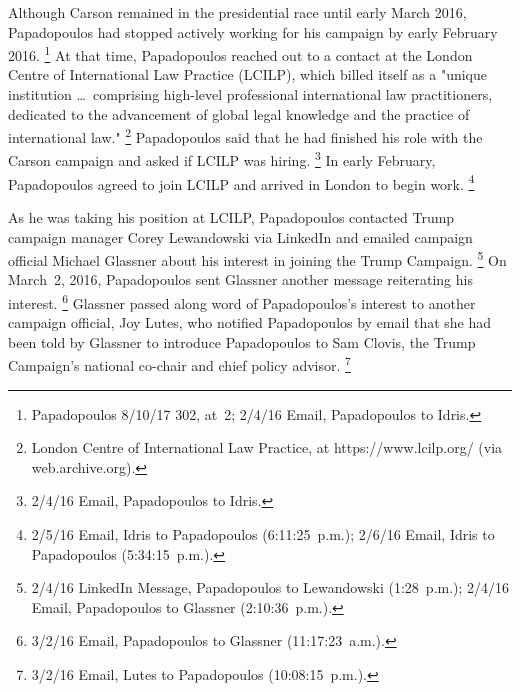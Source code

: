 Although Carson remained in the presidential race until early March 2016, Papadopoulos had stopped actively working for his campaign by early February 2016.%
\footnote{Papadopoulos 8/10/17 302, at~2; 2/4/16 Email, Papadopoulos to Idris.}
At that time, Papadopoulos reached out to a contact at the London Centre of International Law Practice (LCILP), which billed itself as a "unique institution \dots\ comprising high-level professional international law practitioners, dedicated to the advancement of global legal knowledge and the practice of international law."%
\footnote{London Centre of International Law Practice, at https://www.lcilp.org/ (via web.archive.org).}
Papadopoulos said that he had finished his role with the Carson campaign and asked if LCILP was hiring.%
\footnote{2/4/16 Email, Papadopoulos to Idris.}
In early February, Papadopoulos agreed to join LCILP and arrived in London to begin work.%
\footnote{2/5/16 Email, Idris to Papadopoulos (6:11:25~p.m.);
2/6/16 Email, Idris to Papadopoulos (5:34:15~p.m.).}

As he was taking his position at LCILP, Papadopoulos contacted Trump campaign manager Corey Lewandowski via LinkedIn and emailed campaign official Michael Glassner about his interest in joining the Trump Campaign.%
\footnote{2/4/16 LinkedIn Message, Papadopoulos to Lewandowski (1:28~p.m.);
2/4/16 Email, Papadopoulos to Glassner (2:10:36~p.m.).}
On March~2, 2016, Papadopoulos sent Glassner another message reiterating his interest.%
\footnote{3/2/16 Email, Papadopoulos to Glassner (11:17:23~a.m.).}
Glassner passed along word of Papadopoulos's interest to another campaign official, Joy Lutes, who notified Papadopoulos by email that she had been told by Glassner to introduce Papadopoulos to Sam Clovis, the Trump Campaign's national co-chair and chief policy advisor.%
\footnote{3/2/16 Email, Lutes to Papadopoulos (10:08:15~p.m.).}

